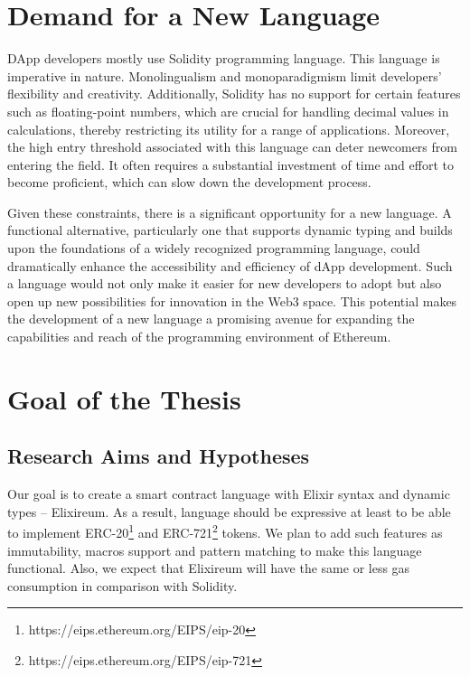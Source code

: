 \section{Demand for a New Language}
\label{sec:langdemand}

DApp developers mostly use Solidity programming language. This language is imperative in nature. Monolingualism and monoparadigmism limit developers' flexibility and creativity. Additionally, Solidity has no support for certain features such as floating-point numbers, which are crucial for handling decimal values in calculations, thereby restricting its utility for a range of applications. Moreover, the high entry threshold associated with this language can deter newcomers from entering the field. It often requires a substantial investment of time and effort to become proficient, which can slow down the development process.

Given these constraints, there is a significant opportunity for a new language. A functional alternative, particularly one that supports dynamic typing and builds upon the foundations of a widely recognized programming language, could dramatically enhance the accessibility and efficiency of dApp development. Such a language would not only make it easier for new developers to adopt but also open up new possibilities for innovation in the Web3 space. This potential makes the development of a new language a promising avenue for expanding the capabilities and reach of the programming environment of Ethereum.

\section{Goal of the Thesis}
\label{sec:goal}

\subsection{Research Aims and Hypotheses}
Our goal is to create a smart contract language with Elixir syntax and dynamic types -- Elixireum. As a result, language should be expressive at least to be able to implement ERC-20\footnote{https://eips.ethereum.org/EIPS/eip-20} and ERC-721\footnote{https://eips.ethereum.org/EIPS/eip-721} tokens. We plan to add such features as immutability, macros support and pattern matching to make this language functional. Also, we expect that Elixireum will have the same or less gas consumption in comparison with Solidity.


